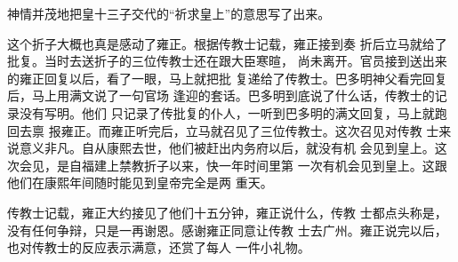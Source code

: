 神情并茂地把皇十三子交代的“祈求皇上”的意思写了出来。%
\par
这个折子大概也真是感动了雍正。根据传教士记载，雍正接到奏%
折后立马就给了批复。当时去送折子的三位传教士还在跟大臣寒暄，%
尚未离开。官员接到送出来的雍正回复以后，看了一眼，马上就把批%
复递给了传教士。巴多明神父看完回复后，马上用满文说了一句官场%
逢迎的套话。巴多明到底说了什么话，传教士的记录没有写明。他们%
只记录了传批复的仆人，一听到巴多明的满文回复，马上就跑回去禀%
报雍正。而雍正听完后，立马就召见了三位传教士。这次召见对传教%
士来说意义非凡。自从康熙去世，他们被赶出内务府以后，就没有机%
会见到皇上。这次会见，是自福建上禁教折子以来，快一年时间里第%
一次有机会见到皇上。这跟他们在康熙年间随时能见到皇帝完全是两%
重天。%
\par
传教士记载，雍正大约接见了他们十五分钟，雍正说什么，传教%
士都点头称是，没有任何争辩，只是一再谢恩。感谢雍正同意让传教%
士去广州。雍正说完以后，也对传教士的反应表示满意，还赏了每人%
一件小礼物。%
